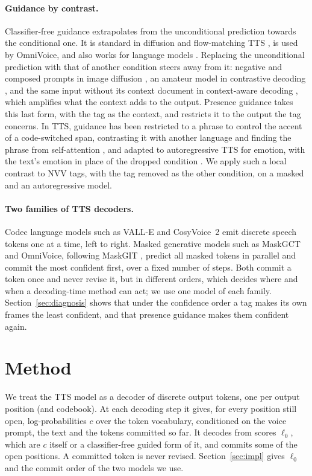 \documentclass[11pt]{article}
\begin{document}
\paragraph{Guidance by contrast.} Classifier-free guidance \citep{ho2022cfg} extrapolates from the unconditional prediction towards the conditional one. It is standard in diffusion and flow-matching TTS \citep{le2023voicebox,chen2024f5tts}, is used by OmniVoice, and also works for language models \citep{sanchez2024stay}. Replacing the unconditional prediction with that of another condition steers away from it: negative and composed prompts in image diffusion \citep{liu2022composable}, an amateur model in contrastive decoding \citep{li2023contrastive}, and the same input without its context document in context-aware decoding \citep{shi2024cad}, which amplifies what the context adds to the output. Presence guidance takes this last form, with the tag as the context, and restricts it to the output the tag concerns. In TTS, guidance has been restricted to a phrase to control the accent of a code-switched span, contrasting it with another language and finding the phrase from self-attention \citep{lee2026plcg}, and adapted to autoregressive TTS for emotion, with the text's emotion in place of the dropped condition \citep{peng2025ccg}. We apply such a local contrast to NVV tags, with the tag removed as the other condition, on a masked and an autoregressive model.

\paragraph{Two families of TTS decoders.} Codec language models such as VALL-E \citep{wang2023valle} and CosyVoice~2 \citep{du2024cosyvoice2} emit discrete speech tokens one at a time, left to right. Masked generative models such as MaskGCT \citep{wang2025maskgct} and OmniVoice, following MaskGIT \citep{chang2022maskgit}, predict all masked tokens in parallel and commit the most confident first, over a fixed number of steps. Both commit a token once and never revise it, but in different orders, which decides where and when a decoding-time method can act; we use one model of each family. Section~\ref{sec:diagnosis} shows that under the confidence order a tag makes its own frames the least confident, and that presence guidance makes them confident again.

\section{Method}
\label{sec:method}
We treat the TTS model as a decoder of discrete output tokens, one per output position (and codebook). At each decoding step it gives, for every position still open, log-probabilities $c$ over the token vocabulary, conditioned on the voice prompt, the text and the tokens committed so far. It decodes from scores $\ell_0$, which are $c$ itself or a classifier-free guided form of it, and commits some of the open positions. A committed token is never revised. Section~\ref{sec:impl} gives $\ell_0$ and the commit order of the two models we use.
\end{document}
